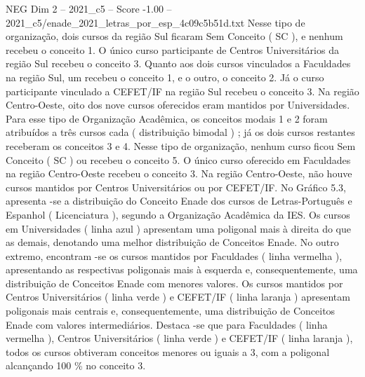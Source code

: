 \begin{textsample}{NEG Dim 2 – 2021\_c5 – Score -1.00 – 2021\_c5/enade\_2021\_letras\_por\_esp\_4c09c5b51d.txt}
Nesse tipo de organização, dois cursos da região Sul ficaram Sem Conceito ( SC ), e nenhum recebeu o conceito 1.
O único curso participante de Centros Universitários da região Sul recebeu o conceito 3.
Quanto aos dois cursos vinculados a Faculdades na região Sul, um recebeu o conceito 1, e o outro, o conceito 2.
Já o curso participante vinculado a CEFET/IF na região Sul recebeu o conceito 3.
Na região Centro-Oeste, oito dos nove cursos oferecidos eram mantidos por Universidades.
Para esse tipo de Organização Acadêmica, os conceitos modais 1 e 2 foram atribuídos a três cursos cada ( distribuição bimodal ) ; já os dois cursos restantes receberam os conceitos 3 e 4.
Nesse tipo de organização, nenhum curso ficou Sem Conceito ( SC ) ou recebeu o conceito 5.
O único curso oferecido em Faculdades na região Centro-Oeste recebeu o conceito 3.
Na região Centro-Oeste, não houve cursos mantidos por Centros Universitários ou por CEFET/IF.
No Gráfico 5.3, apresenta -se a distribuição do Conceito Enade dos cursos de Letras-Português e Espanhol ( Licenciatura ), segundo a Organização Acadêmica da IES.
Os cursos em Universidades ( linha azul ) apresentam uma poligonal mais à direita do que as demais, denotando uma melhor distribuição de Conceitos Enade.
No outro extremo, encontram -se os cursos mantidos por Faculdades ( linha vermelha ), apresentando as respectivas poligonais mais à esquerda e, consequentemente, uma distribuição de Conceitos Enade com menores valores.
Os cursos mantidos por Centros Universitários ( linha verde ) e CEFET/IF ( linha laranja ) apresentam poligonais mais centrais e, consequentemente, uma distribuição de Conceitos Enade com valores intermediários.
Destaca -se que para Faculdades ( linha vermelha ), Centros Universitários ( linha verde ) e CEFET/IF ( linha laranja ), todos os cursos obtiveram conceitos menores ou iguais a 3, com a poligonal alcançando 100 \% no conceito 3.

\end{textsample}
